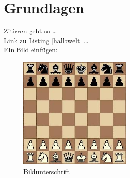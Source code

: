 \section{Grundlagen}

Zitieren\cite{chesswiki} geht so \ldots \\
Link zu Listing \ref{hallowelt} \ldots \\
Ein Bild einfügen:
\begin{figure}[h]
  \centering
  \includegraphics[width=0.5\textwidth]{images/chess.jpg}
  \caption[Titel im Abbildungsverzeichniss]{Bildunterschrift}
  \label{fig:image1}
\end{figure}